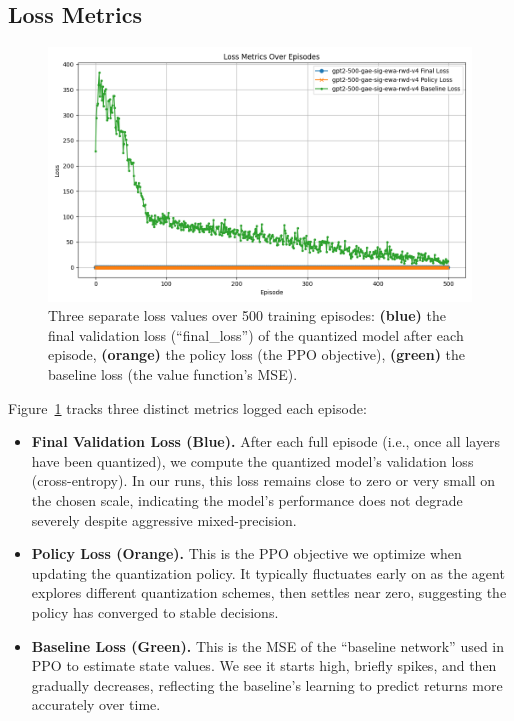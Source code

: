 \documentclass{article}
\begin{document}
	\subsection{Loss Metrics}
	\begin{figure}[ht]
		\centering
		\includegraphics[width=\columnwidth]{gpt2-500-gae-sig-ewa-rwd-v4-losses.png}
		\vspace{-1em}
		\caption{\small
			Three separate loss values over 500 training episodes:
			\textbf{(blue)} the final validation loss (``final\_loss'') of the quantized model after each episode,
			\textbf{(orange)} the policy loss (the PPO objective),
			\textbf{(green)} the baseline loss (the value function’s MSE).}
		\label{fig:loss_curves}
		\vspace{-0.2em}
	\end{figure}
	
	Figure~\ref{fig:loss_curves} tracks three distinct metrics logged each episode:
	\begin{itemize}
		\item \textbf{Final Validation Loss (Blue).} 
		After each full episode (i.e., once all layers have been quantized), we compute the quantized model's validation loss (cross-entropy). 
		In our runs, this loss remains close to zero or very small on the chosen scale, indicating the model’s performance does not degrade severely despite aggressive mixed-precision.
		
		\item \textbf{Policy Loss (Orange).} 
		This is the PPO objective we optimize when updating the quantization policy. 
		It typically fluctuates early on as the agent explores different quantization schemes, then settles near zero, suggesting the policy has converged to stable decisions.
		
		\item \textbf{Baseline Loss (Green).}		
		This is the MSE of the “baseline network” used in PPO to estimate state values. 
		We see it starts high, briefly spikes, and then gradually decreases, reflecting the baseline’s learning to predict returns more accurately over time.
	\end{itemize}
	
\end{document}
